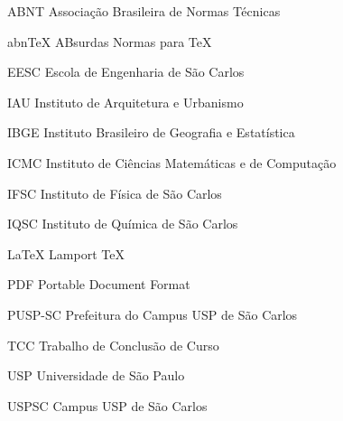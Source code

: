 \begin{siglas}
    \item[ABNT] Associação Brasileira de Normas Técnicas
    \item[abnTeX] ABsurdas Normas para TeX
	\item[EESC] Escola de Engenharia de São Carlos
	\item[IAU] Instituto de Arquitetura e Urbanismo
	\item[IBGE] Instituto Brasileiro de Geografia e Estatística
	\item[ICMC] Instituto de Ciências Matemáticas e de Computação
	\item[IFSC] Instituto de Física de São Carlos
	\item[IQSC] Instituto de Química de São Carlos
	\item[LaTeX] Lamport TeX
	\item[PDF] Portable Document Format
	\item[PUSP-SC] Prefeitura do Campus USP de São Carlos
	\item[TCC] Trabalho de Conclusão de Curso
	\item[USP] Universidade de São Paulo
	\item[USPSC] Campus USP de São Carlos
\end{siglas}
